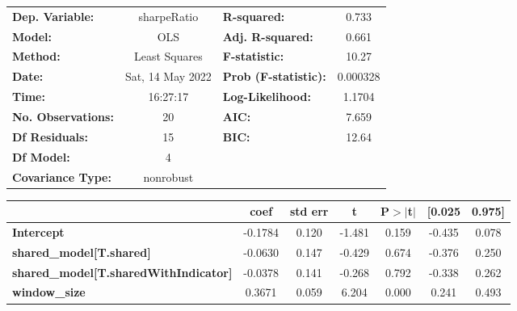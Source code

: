 \begin{center}
\begin{tabular}{lclc}
\toprule
\textbf{Dep. Variable:}                       &   sharpeRatio    & \textbf{  R-squared:         } &     0.733   \\
\textbf{Model:}                               &       OLS        & \textbf{  Adj. R-squared:    } &     0.661   \\
\textbf{Method:}                              &  Least Squares   & \textbf{  F-statistic:       } &     10.27   \\
\textbf{Date:}                                & Sat, 14 May 2022 & \textbf{  Prob (F-statistic):} &  0.000328   \\
\textbf{Time:}                                &     16:27:17     & \textbf{  Log-Likelihood:    } &    1.1704   \\
\textbf{No. Observations:}                    &          20      & \textbf{  AIC:               } &     7.659   \\
\textbf{Df Residuals:}                        &          15      & \textbf{  BIC:               } &     12.64   \\
\textbf{Df Model:}                            &           4      & \textbf{                     } &             \\
\textbf{Covariance Type:}                     &    nonrobust     & \textbf{                     } &             \\
\bottomrule
\end{tabular}
\begin{tabular}{lcccccc}
                                              & \textbf{coef} & \textbf{std err} & \textbf{t} & \textbf{P$> |$t$|$} & \textbf{[0.025} & \textbf{0.975]}  \\
\midrule
\textbf{Intercept}                            &      -0.1784  &        0.120     &    -1.481  &         0.159        &       -0.435    &        0.078     \\
\textbf{shared\_model[T.shared]}              &      -0.0630  &        0.147     &    -0.429  &         0.674        &       -0.376    &        0.250     \\
\textbf{shared\_model[T.sharedWithIndicator]} &      -0.0378  &        0.141     &    -0.268  &         0.792        &       -0.338    &        0.262     \\
\textbf{window\_size}                         &       0.3671  &        0.059     &     6.204  &         0.000        &        0.241    &        0.493     \\

\end{tabular}
\end{center}

